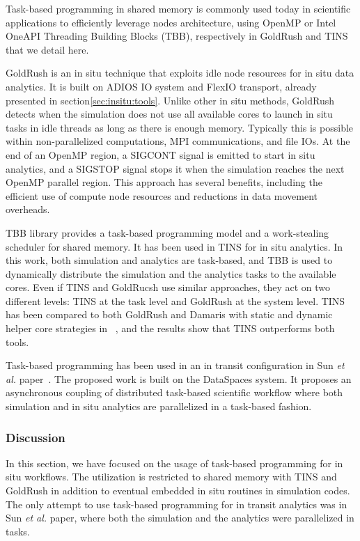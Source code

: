 Task-based programming in shared memory is commonly used today in scientific applications to efficiently leverage nodes architecture, using OpenMP\cite{openMP} or Intel OneAPI Threading Building Blocks (TBB)\cite{Robison2011tbb}, respectively in GoldRush and TINS that we detail here. 

GoldRush\cite{zheng2013goldrush} is an in situ technique that exploits idle node resources for in situ data analytics. It is built on ADIOS IO system and FlexIO transport, already presented in section\ref{sec:insitu:tools}. Unlike other in situ methods, GoldRush detects when the simulation does not use all available cores to launch in situ tasks in idle threads as long as there is enough memory. Typically this is possible within non-parallelized computations, MPI communications, and file IOs. At the end of an OpenMP region, a SIGCONT signal is emitted to start in situ analytics, and a SIGSTOP signal stops it when the simulation reaches the next OpenMP parallel region. 
This approach has several benefits, including the efficient use of compute node resources and reductions in data movement overheads.

TBB library provides a task-based programming model and a work-stealing scheduler for shared memory. It has been used in TINS\cite{yokota_tins_2018, dirand2018integration} for in situ analytics. In this work, both simulation and analytics are task-based, and TBB is used to dynamically distribute the simulation and the analytics tasks to the available cores. Even if TINS and GoldRucsh use similar approaches, they act on two different levels: TINS at the task level and GoldRush at the system level. TINS has been compared to both GoldRush and Damaris with static and dynamic helper core strategies in  ~\cite{dirand2018tins}, and the results show that TINS outperforms both tools.

Task-based programming has been used in an in transit configuration in Sun \textit{et al.} paper~\cite{staging_2016_manish}. The proposed work is built on the DataSpaces system. It proposes an asynchronous coupling of distributed task-based scientific workflow where both simulation and in situ analytics are parallelized in a task-based fashion. 

\subsubsection{Discussion}
In this section, we have focused on the usage of task-based programming for in situ workflows. The utilization is restricted to shared memory with TINS and GoldRush in addition to eventual embedded in situ routines in simulation codes. 
The only attempt to use task-based programming for in transit analytics was in Sun \textit{et al.} paper, where both the simulation and the analytics were parallelized in tasks. 

